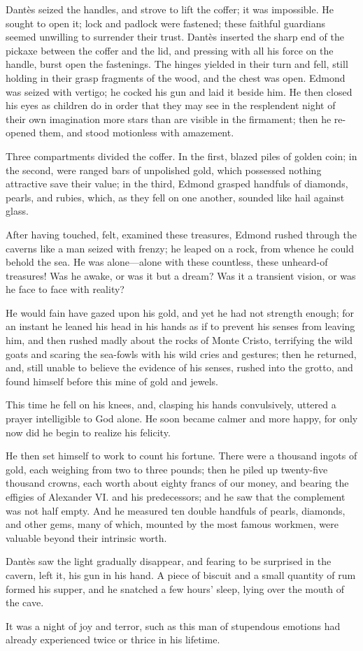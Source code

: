  Dantès seized the handles, and strove to lift the coffer; it was impossible. He sought to open it; lock and padlock were fastened; these faithful guardians seemed unwilling to surrender their trust. Dantès inserted the sharp end of the pickaxe between the coffer and the lid, and pressing with all his force on the handle, burst open the fastenings. The hinges yielded in their turn and fell, still holding in their grasp fragments of the wood, and the chest was open.  Edmond was seized with vertigo; he cocked his gun and laid it beside him. He then closed his eyes as children do in order that they may see in the resplendent night of their own imagination more stars than are visible in the firmament; then he re-opened them, and stood motionless with amazement. 

 Three compartments divided the coffer. In the first, blazed piles of golden coin; in the second, were ranged bars of unpolished gold, which possessed nothing attractive save their value; in the third, Edmond grasped handfuls of diamonds, pearls, and rubies, which, as they fell on one another, sounded like hail against glass. 

 After having touched, felt, examined these treasures, Edmond rushed through the caverns like a man seized with frenzy; he leaped on a rock, from whence he could behold the sea. He was alone—alone with these countless, these unheard-of treasures! Was he awake, or was it but a dream? Was it a transient vision, or was he face to face with reality? 

 He would fain have gazed upon his gold, and yet he had not strength enough; for an instant he leaned his head in his hands as if to prevent his senses from leaving him, and then rushed madly about the rocks of Monte Cristo, terrifying the wild goats and scaring the sea-fowls with his wild cries and gestures; then he returned, and, still unable to believe the evidence of his senses, rushed into the grotto, and found himself before this mine of gold and jewels. 

 This time he fell on his knees, and, clasping his hands convulsively, uttered a prayer intelligible to God alone. He soon became calmer and more happy, for only now did he begin to realize his felicity. 

 He then set himself to work to count his fortune. There were a thousand ingots of gold, each weighing from two to three pounds; then he piled up twenty-five thousand crowns, each worth about eighty francs of our money, and bearing the effigies of Alexander VI. and his predecessors; and he saw that the complement was not half empty. And he measured ten double handfuls of pearls, diamonds, and other gems, many of which, mounted by the most famous workmen, were valuable beyond their intrinsic worth. 

 Dantès saw the light gradually disappear, and fearing to be surprised in the cavern, left it, his gun in his hand. A piece of biscuit and a small quantity of rum formed his supper, and he snatched a few hours' sleep, lying over the mouth of the cave. 

 It was a night of joy and terror, such as this man of stupendous emotions had already experienced twice or thrice in his lifetime. 